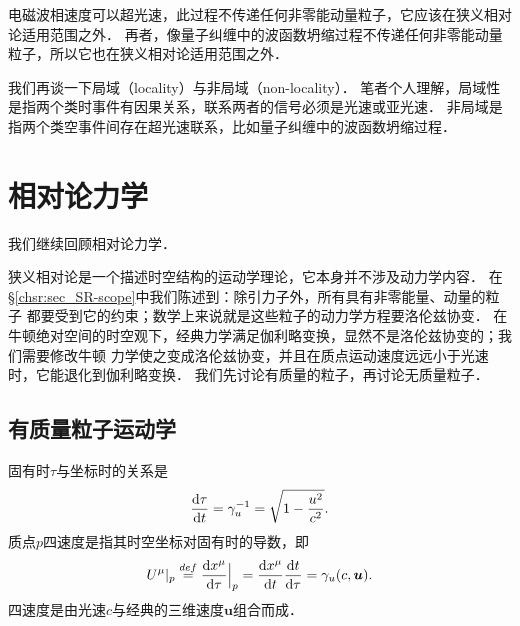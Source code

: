 电磁波相速度可以超光速，此过程不传递任何非零能动量粒子，它应该在狭义相对论适用范围之外．
再者，像量子纠缠中的波函数坍缩过程不传递任何非零能动量粒子，所以它也在狭义相对论适用范围之外．


我们再谈一下局域（locality）与非局域（non-locality）．
笔者个人理解，局域性是指两个类时事件有因果关系，联系两者的信号必须是光速或亚光速．
非局域是指两个类空事件间存在超光速联系，比如量子纠缠中的波函数坍缩过程．




\section{相对论力学}\label{chsr:sec_relativitic-mech}
我们继续回顾相对论力学．

狭义相对论是一个描述时空结构的运动学理论，它本身并不涉及动力学内容．
在\S\ref{chsr:sec_SR-scope}中我们陈述到：除引力子外，所有具有非零能量、动量的粒子
都要受到它的约束；数学上来说就是这些粒子的动力学方程要洛伦兹协变．
在牛顿绝对空间的时空观下，经典力学满足伽利略变换，显然不是洛伦兹协变的；我们需要修改牛顿
力学使之变成洛伦兹协变，并且在质点运动速度远远小于光速时，它能退化到伽利略变换．
我们先讨论有质量的粒子，再讨论无质量粒子．

\subsection{有质量粒子运动学}
固有时$\tau$与坐标时的关系是
\begin{equation}
	\dfrac{{\rm d} \tau}{{\rm d} t}=\gamma_u^{-1} = \sqrt{1-\frac{u^2}{c^2}}.
\end{equation}
质点$p$四速度是指其时空坐标对固有时的导数，即
\begin{equation}\label{chsr:eqn_4U}
	U^\mu |_p \overset{def}{=} \dfrac{{\rm d} x^\mu}{{\rm d} \tau} \Big|_p
	= \dfrac{{\rm d} x^\mu}{{\rm d} t} \dfrac{{\rm d} t}{{\rm d} \tau}
	= \gamma_u (c,\boldsymbol{u}).
\end{equation}
四速度是由光速$c$与经典的三维速度$\boldsymbol{u}$组合而成．

  

